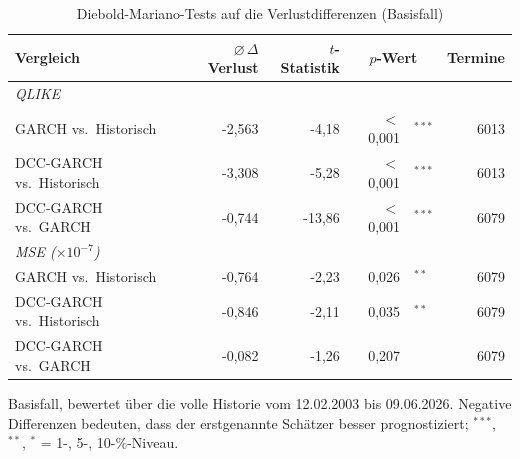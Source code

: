 \begin{table}[htbp]
  \centering
  \footnotesize
  \begin{tabular}{lrrr@{}lr}
    \toprule
    Vergleich & $\varnothing\,\Delta$ Verlust & $t$-Statistik & \multicolumn{2}{c}{$p$-Wert} & Termine \\
    \midrule
    \multicolumn{6}{l}{\textit{QLIKE}} \\
    \quad GARCH vs.\ Historisch & -2,563 & -4,18 & $<$0,001 & $^{***}$ & 6013 \\
    \quad DCC-GARCH vs.\ Historisch & -3,308 & -5,28 & $<$0,001 & $^{***}$ & 6013 \\
    \quad DCC-GARCH vs.\ GARCH & -0,744 & -13,86 & $<$0,001 & $^{***}$ & 6079 \\
    \midrule
    \multicolumn{6}{l}{\textit{MSE ($\times 10^{-7}$)}} \\
    \quad GARCH vs.\ Historisch & -0,764 & -2,23 & 0,026 & $^{**}$ & 6079 \\
    \quad DCC-GARCH vs.\ Historisch & -0,846 & -2,11 & 0,035 & $^{**}$ & 6079 \\
    \quad DCC-GARCH vs.\ GARCH & -0,082 & -1,26 & 0,207 &  & 6079 \\
    \bottomrule
  \end{tabular}
  \caption{Diebold-Mariano-Tests auf die Verlustdifferenzen (Basisfall)}
  \label{tab:dmw}
  \begin{minipage}{\linewidth}\vspace{0.4em}\centering\footnotesize
  Basisfall, bewertet über die volle Historie vom 12.02.2003 bis 09.06.2026. Negative Differenzen bedeuten, dass der erstgenannte Schätzer besser prognostiziert; $^{***}$, $^{**}$, $^{*}$ = 1-, 5-, 10-\%-Niveau.
  \end{minipage}
\end{table}
